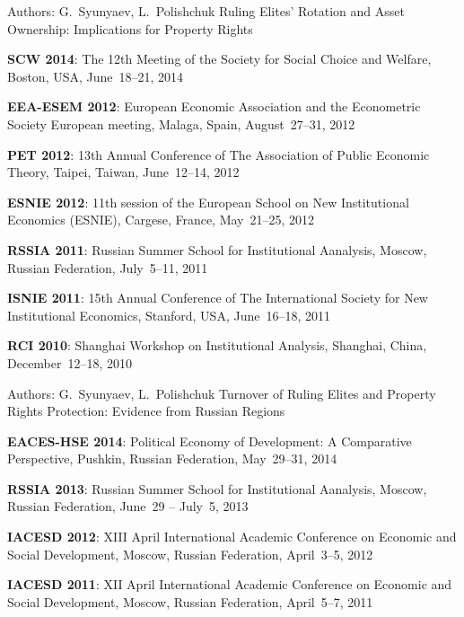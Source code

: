 \begin{cventries}
  \cventry
    {Authors: G.~Syunyaev, L.~Polishchuk} %
    {Ruling Elites' Rotation and Asset Ownership: Implications for Property Rights} %
    {} %
    {} %
    {
      \begin{cvitems} %
        \item {\textbf{SCW 2014}: The 12th Meeting of the Society for Social Choice and Welfare, Boston, USA, June~18--21, 2014}
        \item {\textbf{EEA-ESEM 2012}: European Economic Association and the Econometric Society European meeting, Malaga, Spain, August~27--31, 2012}
        \item {\textbf{PET 2012}: 13th Annual Conference of The Association of Public Economic Theory, Taipei, Taiwan, June~12--14, 2012}
        \item {\textbf{ESNIE 2012}: 11th session of the European School on New Institutional Economics (ESNIE), Cargese, France, May~21--25, 2012}
        \item {\textbf{RSSIA 2011}: Russian Summer School for Institutional Aanalysis, Moscow, Russian Federation, July~5--11, 2011}
        \item {\textbf{ISNIE 2011}: 15th Annual Conference of The International Society for New Institutional Economics, Stanford, USA, June~16--18, 2011}
        \item {\textbf{RCI 2010}: Shanghai Workshop on Institutional Analysis, Shanghai, China, December~12--18, 2010}
      \end{cvitems}
    }

  \cventry
    {Authors: G.~Syunyaev, L.~Polishchuk} %
    {Turnover of Ruling Elites and Property Rights Protection: Evidence from Russian Regions} %
    {} %
    {} %
    {
      \begin{cvitems} %
        \item {\textbf{EACES-HSE 2014}: Political Economy of Development: A Comparative Perspective, Pushkin, Russian Federation, May~29--31, 2014}
        \item {\textbf{RSSIA 2013}: Russian Summer School for Institutional Aanalysis, Moscow, Russian Federation, June~29 -- July~5, 2013}
        \item {\textbf{IACESD 2012}: XIII April International Academic Conference on Economic and Social Development, Moscow, Russian Federation, April~3--5, 2012}
        \item {\textbf{IACESD 2011}: XII April International Academic Conference on Economic and Social Development, Moscow, Russian Federation, April~5--7, 2011}
      \end{cvitems}
    }

\end{cventries}
